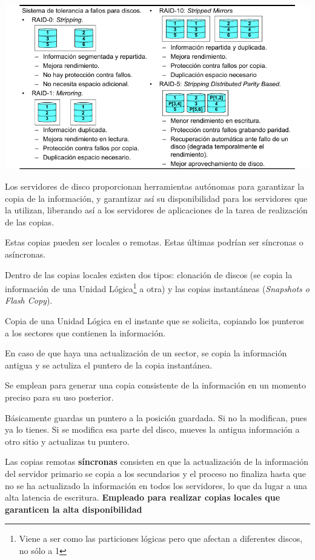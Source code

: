\documentclass{apuntes}[nochap]
\begin{document}
\begin{center}
\includegraphics[width=\linewidth]{img/raid.png}
\end{center}

Los servidores de disco proporcionan herramientas autónomas para garantizar la copia de la información, y garantizar así su disponibilidad para los servidores que la utilizan, liberando así a los servidores de aplicaciones de la tarea de realización de las copias.

Estas copias pueden ser locales o remotas. Estas últimas podrían ser síncronas o asíncronas.

Dentro de las copias locales existen dos tipos: clonación de discos (se copia la información de una Unidad Lógica\footnote{Viene a ser como las particiones lógicas pero que afectan a diferentes discos, no sólo a 1} a otra) y las copias instantáneas (\textit{Snapshots o Flash Copy}).

\begin{defn}
Copia de una Unidad Lógica en el instante que se solicita, copiando los punteros a los sectores que contienen la información.

En caso de que haya una actualización de un sector, se copia la información antigua y se actuliza el puntero de la copia instantánea.

Se emplean para generar una copia consistente de la información en un momento preciso para su uso posterior.

\obs Básicamente guardas un puntero a la posición guardada. Si no la modifican, pues ya lo tienes. Si se modifica esa parte del disco, mueves la antigua información a otro sitio y actualizas tu puntero.
\end{defn}

Las copias remotas \textbf{síncronas} consisten en que la actualización de la información del servidor primario se copia a los secundarios y el proceso no finaliza hasta que no se ha actualizado la información en todos los servidores, lo que da lugar a una alta latencia de escritura. \textbf{Empleado para realizar copias locales que garanticen la alta disponibilidad}
\end{document}
